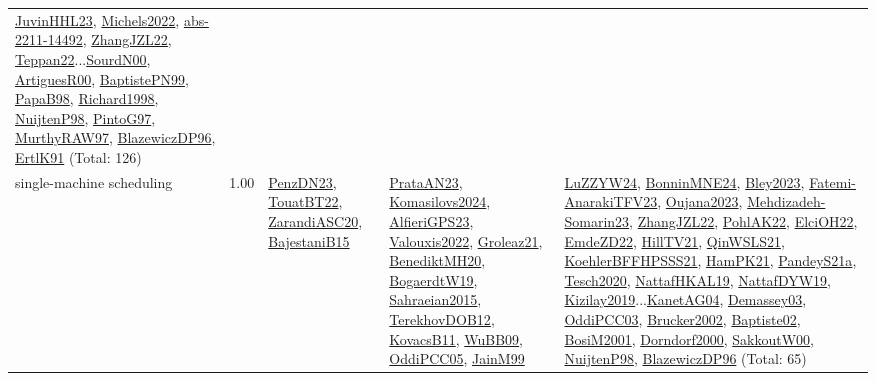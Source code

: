 {\begin{longtable}{p{3cm}r>{\raggedright\arraybackslash}p{6cm}>{\raggedright\arraybackslash}p{6cm}>{\raggedright\arraybackslash}p{8cm}}
\hyperref[detail:JuvinHHL23]{JuvinHHL23}, \hyperref[detail:Michels2022]{Michels2022}, \hyperref[detail:abs-2211-14492]{abs-2211-14492}, \hyperref[detail:ZhangJZL22]{ZhangJZL22}, \hyperref[detail:Teppan22]{Teppan22}...\hyperref[detail:SourdN00]{SourdN00}, \hyperref[detail:ArtiguesR00]{ArtiguesR00}, \hyperref[detail:BaptistePN99]{BaptistePN99}, \hyperref[detail:PapaB98]{PapaB98}, \hyperref[detail:Richard1998]{Richard1998}, \hyperref[detail:NuijtenP98]{NuijtenP98}, \hyperref[detail:PintoG97]{PintoG97}, \hyperref[detail:MurthyRAW97]{MurthyRAW97}, \hyperref[detail:BlazewiczDP96]{BlazewiczDP96}, \hyperref[detail:ErtlK91]{ErtlK91} (Total: 126)\\
\index{single-machine scheduling}\index{Concepts!single-machine scheduling}single-machine scheduling &  1.00 & \hyperref[detail:PenzDN23]{PenzDN23}, \hyperref[detail:TouatBT22]{TouatBT22}, \hyperref[detail:ZarandiASC20]{ZarandiASC20}, \hyperref[detail:BajestaniB15]{BajestaniB15} & \hyperref[detail:PrataAN23]{PrataAN23}, \hyperref[detail:Komasilovs2024]{Komasilovs2024}, \hyperref[detail:AlfieriGPS23]{AlfieriGPS23}, \hyperref[detail:Valouxis2022]{Valouxis2022}, \hyperref[detail:Groleaz21]{Groleaz21}, \hyperref[detail:BenediktMH20]{BenediktMH20}, \hyperref[detail:BogaerdtW19]{BogaerdtW19}, \hyperref[detail:Sahraeian2015]{Sahraeian2015}, \hyperref[detail:TerekhovDOB12]{TerekhovDOB12}, \hyperref[detail:KovacsB11]{KovacsB11}, \hyperref[detail:WuBB09]{WuBB09}, \hyperref[detail:OddiPCC05]{OddiPCC05}, \hyperref[detail:JainM99]{JainM99} & \hyperref[detail:LuZZYW24]{LuZZYW24}, \hyperref[detail:BonninMNE24]{BonninMNE24}, \hyperref[detail:Bley2023]{Bley2023}, \hyperref[detail:Fatemi-AnarakiTFV23]{Fatemi-AnarakiTFV23}, \hyperref[detail:Oujana2023]{Oujana2023}, \hyperref[detail:Mehdizadeh-Somarin23]{Mehdizadeh-Somarin23}, \hyperref[detail:ZhangJZL22]{ZhangJZL22}, \hyperref[detail:PohlAK22]{PohlAK22}, \hyperref[detail:ElciOH22]{ElciOH22}, \hyperref[detail:EmdeZD22]{EmdeZD22}, \hyperref[detail:HillTV21]{HillTV21}, \hyperref[detail:QinWSLS21]{QinWSLS21}, \hyperref[detail:KoehlerBFFHPSSS21]{KoehlerBFFHPSSS21}, \hyperref[detail:HamPK21]{HamPK21}, \hyperref[detail:PandeyS21a]{PandeyS21a}, \hyperref[detail:Tesch2020]{Tesch2020}, \hyperref[detail:NattafHKAL19]{NattafHKAL19}, \hyperref[detail:NattafDYW19]{NattafDYW19}, \hyperref[detail:Kizilay2019]{Kizilay2019}...\hyperref[detail:KanetAG04]{KanetAG04}, \hyperref[detail:Demassey03]{Demassey03}, \hyperref[detail:OddiPCC03]{OddiPCC03}, \hyperref[detail:Brucker2002]{Brucker2002}, \hyperref[detail:Baptiste02]{Baptiste02}, \hyperref[detail:BosiM2001]{BosiM2001}, \hyperref[detail:Dorndorf2000]{Dorndorf2000}, \hyperref[detail:SakkoutW00]{SakkoutW00}, \hyperref[detail:NuijtenP98]{NuijtenP98}, \hyperref[detail:BlazewiczDP96]{BlazewiczDP96} (Total: 65)\\

\end{longtable}}
